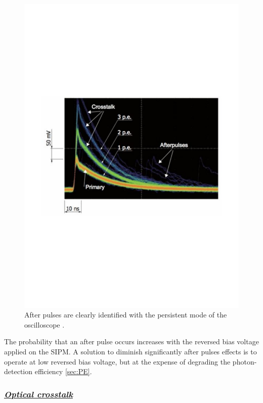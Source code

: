 \documentclass[a4paper, 11pt]{report}%
\begin{document}
  \begin{figure}[!hbtp]
  \centering
    \includegraphics[totalheight=0.5\textwidth,trim=2cm 9cm 3cm 9cm, clip=true, angle = 0]{../Pictures/primary_peak_CT_AP-1.pdf}
    \caption{After pulses are clearly identified with the persistent mode of the oscilloscope \cite{ref:mppc_meg}.}
    \label{fig:AP}
  \end{figure}
  
  The probability that an after pulse occurs increases with the reversed bias voltage applied on the SIPM.  A solution to diminish 
  significantly after pulses effects is 
  to operate at low reversed bias voltage, but at the expense of degrading the photon-detection efficiency \ref{sec:PE}. 
    
  
  \subsubsection{\textit{\underline{Optical crosstalk}}}\label{subsubsec:CT_section}
  
\end{document}
